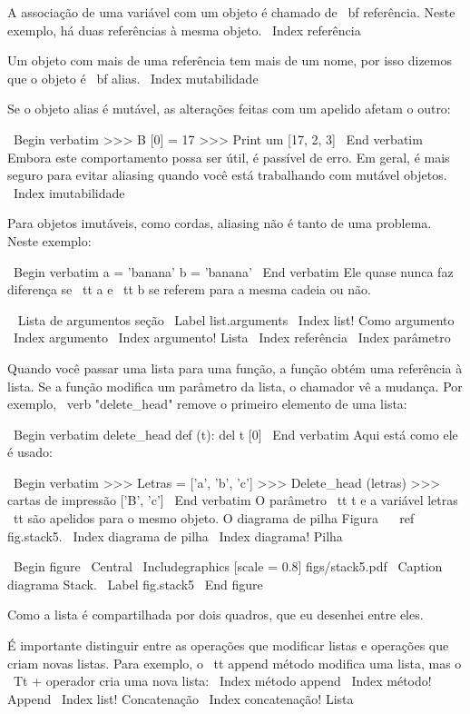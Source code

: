 \documentclass[10pt]{book}
\begin{document}
\begin {itemize}
{{{{{{{A associação de uma variável com um objeto é chamado de {\ bf
referência}. Neste exemplo, há duas referências à mesma
objeto.
\ Index {referência}

Um objeto com mais de uma referência tem mais
de um nome, por isso dizemos que o objeto é {\ bf alias}.
\ Index {} mutabilidade

Se o objeto alias é mutável, as alterações feitas com um apelido afetam
o outro:

\ Begin {verbatim}
>>> B [0] = 17
>>> Print um
[17, 2, 3]
\ End {verbatim}
%
Embora este comportamento possa ser útil, é passível de erro. Em geral,
é mais seguro para evitar aliasing quando você está trabalhando com mutável
objetos.
\ Index {imutabilidade}

Para objetos imutáveis, como cordas, aliasing não é tanto de uma
problema. Neste exemplo:

\ Begin {verbatim}
a = 'banana'
b = 'banana'
\ End {verbatim}
%
Ele quase nunca faz diferença se {\ tt a} e {\ tt b} se referem
para a mesma cadeia ou não.


\ {} Lista de argumentos seção
\ Label {} list.arguments
\ Index {list! Como argumento}
\ Index {argumento}
\ Index {argumento! Lista}
\ Index {referência}
\ Index {parâmetro}

Quando você passar uma lista para uma função, a função obtém uma referência
à lista.
Se a função modifica um parâmetro da lista, o chamador vê a mudança.
Por exemplo, \ verb "delete_head" remove o primeiro elemento de uma lista:

\ Begin {verbatim}
delete_head def (t):
    del t [0]
\ End {verbatim}
%
Aqui está como ele é usado:

\ Begin {verbatim}
>>> Letras = ['a', 'b', 'c']
>>> Delete_head (letras)
>>> cartas de impressão
['B', 'c']
\ End {verbatim}
%
O parâmetro {\ tt t} e {a variável letras \ tt} são
apelidos para o mesmo objeto. O diagrama de pilha
Figura ~ \ ref {} fig.stack5.
\ Index {diagrama de pilha}
\ Index {diagrama! Pilha}

\ Begin {figure}
\ Central
{\ Includegraphics [scale = 0.8] {figs/stack5.pdf}}
\ Caption {diagrama Stack.}
\ Label {} fig.stack5
\ End {figure}


Como a lista é compartilhada por dois quadros, que eu desenhei
entre eles.

É importante distinguir entre as operações que
modificar listas e operações que criam novas listas. Para
exemplo, o {\ tt} append método modifica uma lista, mas o
{\ Tt +} operador cria uma nova lista:
\ Index {método append}
\ Index {método! Append}
\ Index {list! Concatenação}
\ Index {concatenação! Lista}

}}}}}}}
\end{itemize}
\end{document}
